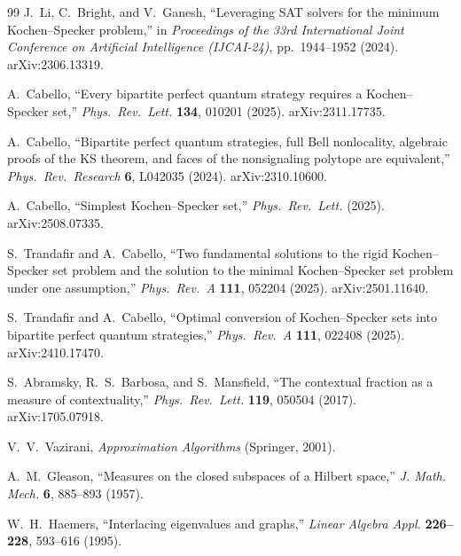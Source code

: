 \documentclass[12pt,a4paper]{article}
\begin{document}
\begin{thebibliography}{99}
J.~Li, C.~Bright, and V.~Ganesh,
``Leveraging SAT solvers for the minimum Kochen--Specker problem,''
in \textit{Proceedings of the 33rd International Joint Conference on Artificial Intelligence (IJCAI-24)}, pp.~1944--1952 (2024).
arXiv:2306.13319.

A.~Cabello,
``Every bipartite perfect quantum strategy requires a Kochen--Specker set,''
\textit{Phys.\ Rev.\ Lett.} \textbf{134}, 010201 (2025).
arXiv:2311.17735.

A.~Cabello,
``Bipartite perfect quantum strategies, full Bell nonlocality, algebraic proofs of the KS theorem, and faces of the nonsignaling polytope are equivalent,''
\textit{Phys.\ Rev.\ Research} \textbf{6}, L042035 (2024).
arXiv:2310.10600.

A.~Cabello,
``Simplest Kochen--Specker set,''
\textit{Phys.\ Rev.\ Lett.} (2025).
arXiv:2508.07335.

S.~Trandafir and A.~Cabello,
``Two fundamental solutions to the rigid Kochen--Specker set problem and the solution to the minimal Kochen--Specker set problem under one assumption,''
\textit{Phys.\ Rev.\ A} \textbf{111}, 052204 (2025).
arXiv:2501.11640.

S.~Trandafir and A.~Cabello,
``Optimal conversion of Kochen--Specker sets into bipartite perfect quantum strategies,''
\textit{Phys.\ Rev.\ A} \textbf{111}, 022408 (2025).
arXiv:2410.17470.

S.~Abramsky, R.~S.~Barbosa, and S.~Mansfield,
``The contextual fraction as a measure of contextuality,''
\textit{Phys.\ Rev.\ Lett.} \textbf{119}, 050504 (2017).
arXiv:1705.07918.

V.~V.~Vazirani,
\textit{Approximation Algorithms}
(Springer, 2001).

A.~M.~Gleason,
``Measures on the closed subspaces of a Hilbert space,''
\textit{J. Math. Mech.} \textbf{6}, 885--893 (1957).

W.~H.~Haemers,
``Interlacing eigenvalues and graphs,''
\textit{Linear Algebra Appl.} \textbf{226--228}, 593--616 (1995).

\end{thebibliography}
\end{document}

